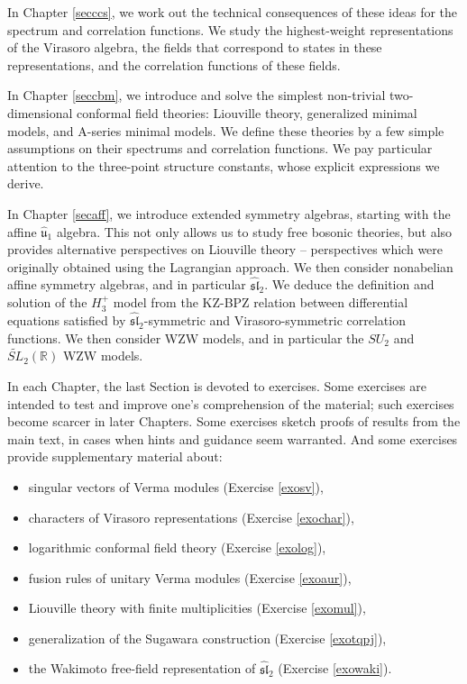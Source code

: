 \documentclass[12pt, a4paper, notitlepage, twoside]{report}
\numberwithin{equation}{section}
\theoremstyle{break}
\begin{document}
In Chapter \ref{secccs}, we work out the technical consequences of these ideas for the spectrum and correlation functions.
We study the highest-weight representations of the Virasoro algebra, the fields that correspond to states in these representations, and the correlation functions of these fields. 

In Chapter \ref{seccbm}, we introduce and solve the simplest non-trivial two-dimensional conformal field theories: Liouville theory, generalized minimal models, and A-series minimal models.
We define these theories by a few simple assumptions on their spectrums and correlation functions.
We pay particular attention to the three-point structure constants, whose explicit expressions we derive. 

In Chapter \ref{secaff}, we introduce extended symmetry algebras, starting with the affine $\hat{\mathfrak{u}}_1$ algebra.
This not only allows us to study free bosonic theories, but also provides alternative perspectives on Liouville theory -- perspectives which were originally obtained using the Lagrangian approach.
We then consider nonabelian affine symmetry algebras, and in particular $\widehat{\mathfrak{sl}}_2$.
We deduce the definition and solution of the $H_3^+$ model from the KZ-BPZ relation between differential equations satisfied by $\widehat{\mathfrak{sl}}_2$-symmetric and Virasoro-symmetric correlation functions.
We then consider WZW models, and in particular the $SU_2$ and $\widetilde{SL}_2(\mathbb{R})$ WZW models. 

In each Chapter, the last Section is devoted to exercises.
Some exercises are intended to test and improve one's comprehension of the material; such exercises become scarcer in later Chapters.
Some exercises sketch proofs of results from the main text, in cases when hints and guidance seem warranted.
And some exercises provide supplementary material about: 
\begin{itemize}
 \item singular vectors of Verma modules (Exercise \ref{exosv}),
 \item characters of Virasoro representations (Exercise \ref{exochar}),
\item logarithmic conformal field theory (Exercise \ref{exolog}), 
\item fusion rules of unitary Verma modules (Exercise \ref{exoaur}), 
\item Liouville theory with finite multiplicities (Exercise \ref{exomul}),
\item generalization of the Sugawara construction (Exercise \ref{exotqpj}),
\item the Wakimoto free-field representation of $\widehat{\mathfrak{sl}}_2$ (Exercise \ref{exowaki}).
\end{itemize}
\end{document}
